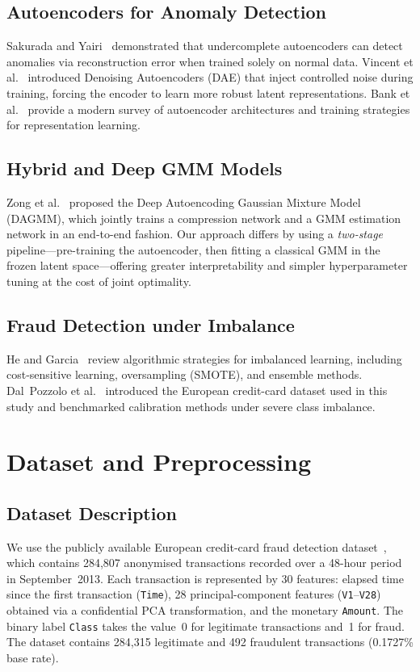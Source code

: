 \documentclass[conference,10pt]{IEEEtran}
\begin{document}
\subsection{Autoencoders for Anomaly Detection}
Sakurada and Yairi~\cite{sakurada2014} demonstrated that undercomplete
autoencoders can detect anomalies via reconstruction error when trained solely
on normal data.  Vincent et al.~\cite{vincent2010} introduced Denoising
Autoencoders (DAE) that inject controlled noise during training, forcing the
encoder to learn more robust latent representations.  Bank et al.~\cite{bank2023}
provide a modern survey of autoencoder architectures and training strategies
for representation learning.

\subsection{Hybrid and Deep GMM Models}
Zong et al.~\cite{zong2018} proposed the Deep Autoencoding Gaussian Mixture
Model (DAGMM), which jointly trains a compression network and a GMM estimation
network in an end-to-end fashion.  Our approach differs by using a
\emph{two-stage} pipeline---pre-training the autoencoder, then fitting a
classical GMM in the frozen latent space---offering greater interpretability
and simpler hyperparameter tuning at the cost of joint optimality.

\subsection{Fraud Detection under Imbalance}
He and Garcia~\cite{he2009} review algorithmic strategies for imbalanced
learning, including cost-sensitive learning, oversampling (SMOTE), and
ensemble methods.  Dal~Pozzolo et al.~\cite{ulb_dataset} introduced the
European credit-card dataset used in this study and benchmarked calibration
methods under severe class imbalance.

\section{Dataset and Preprocessing}
\label{sec:data}

\subsection{Dataset Description}
We use the publicly available European credit-card fraud detection
dataset~\cite{ulb_dataset}, which contains 284,807 anonymised transactions
recorded over a 48-hour period in September~2013.  Each transaction is
represented by 30 features: elapsed time since the first transaction
(\texttt{Time}), 28 principal-component features (\texttt{V1}--\texttt{V28})
obtained via a confidential PCA transformation, and the monetary
\texttt{Amount}.  The binary label \texttt{Class} takes the value~0 for
legitimate transactions and~1 for fraud.  The dataset contains 284,315
legitimate and 492 fraudulent transactions (0.1727\% base rate).
\end{document}
